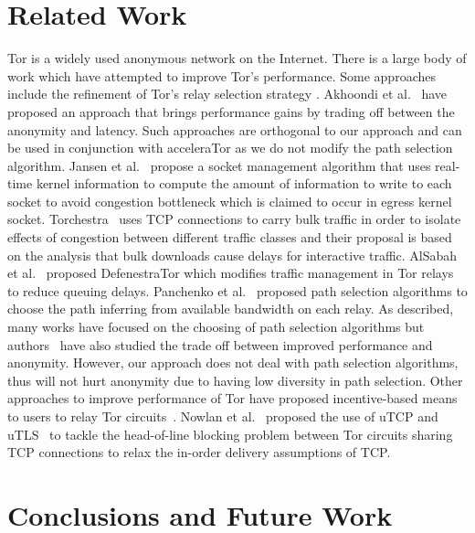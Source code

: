 \documentclass[conference]{IEEEtran}
\begin{document}
\section{Related Work}
\label{sec:re-work}
Tor is a widely used anonymous network on the Internet. There is a large body of work which have attempted to improve Tor's performance. Some approaches include the refinement of Tor's relay selection strategy \cite{6679287, Sherr10a3:an, Snader08atune-up}. Akhoondi et al.~\cite{6679287} have proposed an approach that brings performance gains by trading off between the anonymity and latency. Such approaches are orthogonal to our approach and can be used in conjunction with acceleraTor as we do not modify the path selection algorithm.
Jansen et al.~\cite{184431} propose a socket management algorithm that uses real-time kernel information to compute the amount of information to write to each socket to avoid congestion bottleneck which is claimed to occur in egress kernel socket.
Torchestra~\cite{Gopal:2012:TRI:2381966.2381972} uses TCP connections to carry bulk traffic in order to isolate effects of congestion between different traffic classes and their proposal is based on the analysis that bulk downloads cause delays for interactive traffic. 
AlSabah et al.~\cite{AlSabah:2011:DTO:2032162.2032170} proposed DefenestraTor which modifies traffic management in Tor relays to reduce queuing delays. Panchenko et al.~\cite{5230652} proposed path selection algorithms to choose the path inferring from available bandwidth on each relay.  
As described, many works have focused on the choosing of path selection algorithms but authors~\cite{Panchenko:2008:PAA:1371602.1371906} have also studied the trade off between improved performance and anonymity. However, our approach does not deal with path selection algorithms, thus will not hurt anonymity due to having low diversity in path selection. Other approaches to improve performance of Tor have proposed  incentive-based means to users to relay Tor circuits~\cite{Jansen:2010:RNT:1866307.1866344, Jansen_lira:lightweight}. Nowlan et al.~\cite{179191} proposed the use of uTCP and uTLS~\cite{180706} to tackle the head-of-line blocking problem between Tor circuits sharing TCP connections to relax the in-order delivery assumptions of TCP. 

\section{Conclusions and Future Work}
\label{sec:conclusions}
\end{document}
